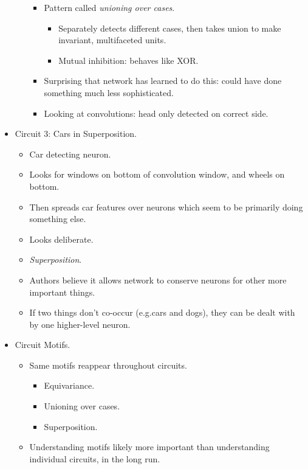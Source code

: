 \begin{itemize}
\begin{itemize}
\begin{itemize}
            \pagebreak
            \item Pattern called \emph{unioning over cases}.
            \begin{itemize}
                \item Separately detects different cases, then takes union to make invariant, multifaceted units.
                \item Mutual inhibition: behaves like XOR.
            \end{itemize}
            \item Surprising that network has learned to do this: could have done something much less sophisticated.
            \item Looking at convolutions: head only detected on correct side.
        \end{itemize}
    \end{itemize}
    \item Circuit 3: Cars in Superposition.
    \begin{itemize}
        \item Car detecting neuron.
        \item Looks for windows on bottom of convolution window, and wheels on bottom.
        \item Then spreads car features over neurons which seem to be primarily doing something else.
        \item Looks deliberate.
        \item \emph{Superposition}.
        \item Authors believe it allows network to conserve neurons for other more important things.
        \item If two things don't co-occur (e.g.\@ cars and dogs), they can be dealt with by one higher-level neuron.
    \end{itemize}
    \item Circuit Motifs.
    \begin{itemize}
        \item Same motifs reappear throughout circuits.
        \begin{itemize}
            \item Equivariance.
            \item Unioning over cases.
            \item Superposition.
        \end{itemize}
        \item Understanding motifs likely more important than understanding individual circuits, in the long run.
    \end{itemize}
\end{itemize}


